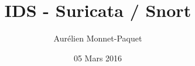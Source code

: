 \documentclass{beamer}
\title{IDS - Suricata / Snort}
\author{Aurélien Monnet-Paquet}
\institute{www.inria.fr}
\date{05 Mars 2016}
\begin{document}
\begin{frame}
\titlepage
\end{frame}
\end{document}

